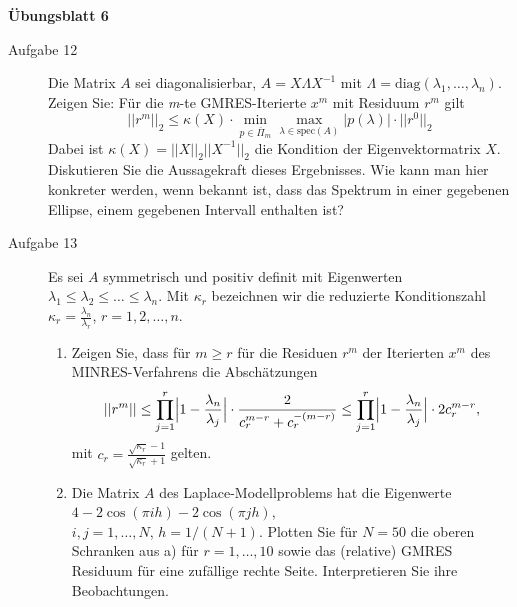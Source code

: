\documentclass[a4paper,11pt]{scrartcl}
\begin{document}
\aihead

\begin{center}
  {\large\textbf{Übungsblatt 6}}
\end{center}


\begin{description}
\item[Aufgabe 12] Die Matrix $A$ sei diagonalisierbar, $A = X\Lambda X^{-1}$ mit $\Lambda = \text{diag}(\lambda_1, \ldots, \lambda_n )$. Zeigen Sie: Für die \textit{m}-te GMRES-Iterierte $x^m$ mit Residuum $r^m$ gilt
\begin{equation*}
||r^m||_2 \leq \kappa(X) \cdot \min_{p \in \overline{\Pi}_m} \max_{\lambda \in \text{spec}(A)} |p(\lambda)| \cdot ||r^0||_2
\end{equation*}
Dabei ist $\kappa(X) = ||X||_2||X^{-1}||_2$ die Kondition der Eigenvektormatrix $X$. Diskutieren Sie die Aussagekraft dieses Ergebnisses. Wie kann man hier konkreter werden, wenn bekannt ist, dass das Spektrum in einer gegebenen Ellipse, einem gegebenen Intervall enthalten ist?

\item[Aufgabe 13] Es sei $A$ symmetrisch und positiv definit mit Eigenwerten $\lambda_1 \leq \lambda_2 \leq \ldots \leq \lambda_n$. Mit $\kappa_r$ bezeichnen wir die reduzierte Konditionszahl $\kappa_r = \frac{\lambda_n}{\lambda_r}$, $r = 1, 2, \ldots, n$.
\begin{enumerate}
\item Zeigen Sie, dass für $m \geq r$ für die Residuen $r^m$ der Iterierten $x^m$ des MINRES-Verfahrens die Abschätzungen 
\begin{equation*}
||r^m|| \leq \prod_{j = 1}^r \Bigl| 1-\frac{\lambda_n}{\lambda_j} \Bigr|\cdot \frac{2}{c_r^{m-r} + c_r^{-(m-r)}} \leq \prod_{j = 1}^r \Bigl| 1-\frac{\lambda_n}{\lambda_j} \Bigr| \cdot 2 c_r^{m-r} ,
\end{equation*}
mit $c_r = \frac{\sqrt{\kappa_r}-1}{\sqrt{\kappa_r}+1}$ gelten.

\item Die Matrix $A$ des Laplace-Modellproblems hat die Eigenwerte $4-2\cos(\pi ih) - 2\cos(\pi jh)$, \\
$i,j = 1,\ldots, N$, $h = 1/(N+1)$. Plotten Sie für $N = 50$ die oberen Schranken aus a) für $r = 1,\ldots,10$ sowie das (relative) GMRES Residuum für eine zufällige rechte Seite. Interpretieren Sie ihre Beobachtungen.
\end{enumerate}




\end{description}
\end{document}
